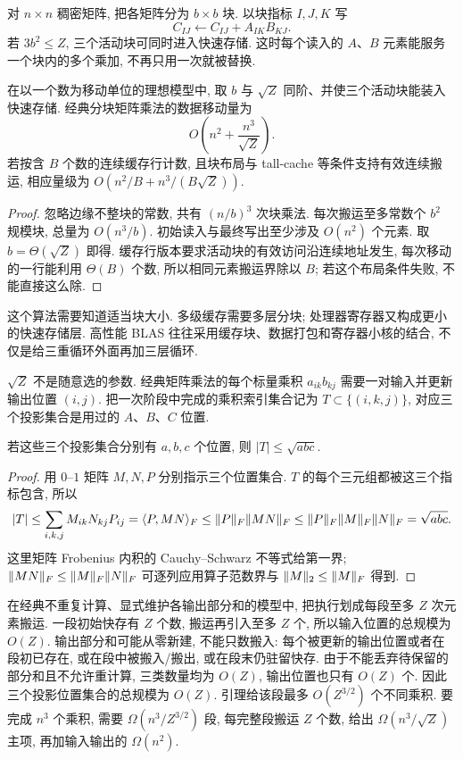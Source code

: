 对 $n\times n$ 稠密矩阵, 把各矩阵分为 $b\times b$ 块. 以块指标 $I,J,K$ 写
\[
C_{IJ}\leftarrow C_{IJ}+A_{IK}B_{KJ}.
\]
若 $3b^2\le Z$, 三个活动块可同时进入快速存储. 这时每个读入的 $A$、$B$ 元素能服务一个块内的多个乘加, 不再只用一次就被替换.

\begin{proposition}\label{prop:blockcache}
在以一个数为移动单位的理想模型中, 取 $b$ 与 $\sqrt Z$ 同阶、并使三个活动块能装入快速存储. 经典分块矩阵乘法的数据移动量为
\[
O\left(n^2+\frac{n^3}{\sqrt Z}\right).
\]
若按含 $B$ 个数的连续缓存行计数, 且块布局与 tall-cache 等条件支持有效连续搬运, 相应量级为 $O(n^2/B+n^3/(B\sqrt Z))$.
\end{proposition}
\begin{proof}
忽略边缘不整块的常数, 共有 $(n/b)^3$ 次块乘法. 每次搬运至多常数个 $b^2$ 规模块, 总量为 $O(n^3/b)$. 初始读入与最终写出至少涉及 $O(n^2)$ 个元素. 取 $b=\Theta(\sqrt Z)$ 即得. 缓存行版本要求活动块的有效访问沿连续地址发生, 每次移动的一行能利用 $\Theta(B)$ 个数, 所以相同元素搬运界除以 $B$; 若这个布局条件失败, 不能直接这么除.
\end{proof}
这个算法需要知道适当块大小. 多级缓存需要多层分块; 处理器寄存器又构成更小的快速存储层. 高性能 BLAS 往往采用缓存块、数据打包和寄存器小核的结合, 不仅是给三重循环外面再加三层循环.

$\sqrt Z$ 不是随意选的参数. 经典矩阵乘法的每个标量乘积 $a_{ik}b_{kj}$ 需要一对输入并更新输出位置 $(i,j)$. 把一次阶段中完成的乘积索引集合记为 $T\subset\{(i,k,j)\}$, 对应三个投影集合是用过的 $A$、$B$、$C$ 位置.

\begin{lemma}
若这些三个投影集合分别有 $a,b,c$ 个位置, 则 $|T|\le\sqrt{abc}$.
\end{lemma}
\begin{proof}
用 $0$--$1$ 矩阵 $M,N,P$ 分别指示三个位置集合. $T$ 的每个三元组都被这三个指标包含, 所以
\[
|T|\le\sum_{i,k,j}M_{ik}N_{kj}P_{ij}
=\langle P,MN\rangle_F
\le\lVert P\rVert_F\lVert MN\rVert_F
\le\lVert P\rVert_F\lVert M\rVert_F\lVert N\rVert_F=\sqrt{abc}.
\]
这里矩阵 Frobenius 内积的 Cauchy--Schwarz 不等式给第一界; $\lVert MN\rVert_F\le\lVert M\rVert_F\lVert N\rVert_F$ 可逐列应用算子范数界与 $\lVert M\rVert_2\le\lVert M\rVert_F$ 得到.
\end{proof}
在经典不重复计算、显式维护各输出部分和的模型中, 把执行划成每段至多 $Z$ 次元素搬运. 一段初始快存有 $Z$ 个数, 搬运再引入至多 $Z$ 个, 所以输入位置的总规模为 $O(Z)$. 输出部分和可能从零新建, 不能只数搬入: 每个被更新的输出位置或者在段初已存在, 或在段中被搬入/搬出, 或在段末仍驻留快存. 由于不能丢弃待保留的部分和且不允许重计算, 三类数量均为 $O(Z)$, 输出位置也只有 $O(Z)$ 个. 因此三个投影位置集合的总规模为 $O(Z)$. 引理给该段最多 $O(Z^{3/2})$ 个不同乘积. 要完成 $n^3$ 个乘积, 需要 $\Omega(n^3/Z^{3/2})$ 段, 每完整段搬运 $Z$ 个数, 给出 $\Omega(n^3/\sqrt Z)$ 主项, 再加输入输出的 $\Omega(n^2)$.

